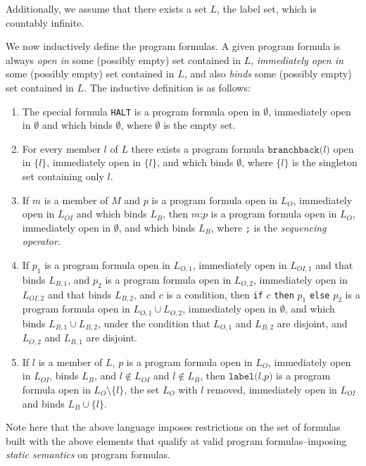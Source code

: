 \documentclass[11pt]{article}
\begin{document}
Additionally, we assume that there exists a set $L$, the label set, which is countably infinite.

We now inductively define the program formulas.  A given program formula is always \emph{open in} some (possibly empty) set contained in $L$, \emph{immediately open in} some (possibly empty) set contained in $L$, and also \emph{binds} some (possibly empty) set contained in $L$.  The inductive definition is as follows:

\begin{enumerate}
\item The special formula \texttt{HALT} is a program formula open in $\emptyset$, immediately open in $\emptyset$ and which binds $\emptyset$, where $\emptyset$ is the empty set.
\item For every member $l$ of $L$ there exists a program formula $\texttt{branchback(}l\texttt{)}$ open in $\{l\}$, immediately open in $\{l\}$, and which binds $\emptyset$, where $\{l\}$ is the singleton set containing only $l$.
\item If $m$ is a member of $M$ and $p$ is a program formula open in $L_{O}$, immediately open in $L_{OI}$ and which binds $L_{B}$, then $m\texttt{;}p$ is a program formula open in $L_{O}$, immediately open in $\emptyset$, and which binds $L_{B}$, where \texttt{;} is the \emph{sequencing operator}.
\item If $p_{1}$ is a program formula open in $L_{O,1}$, immediately open in $L_{OI,1}$ and that binds $L_{B,1}$, and $p_{2}$ is a program formula open in $L_{O,2}$, immediately open in $L_{OI,2}$ and that binds $L_{B,2}$, and $c$ is a condition, then \texttt{if} $c$ \texttt{then} $p_{1}$ \texttt{else} $p_{2}$ is a program formula open in $L_{O,1} \cup L_{O,2}$, immediately open in $\emptyset$, and which binds $L_{B,1} \cup L_{B,2}$, under the condition that $L_{O,1}$ and $L_{B,2}$ are disjoint, and $L_{O,2}$ and $L_{B,1}$ are disjoint.
\item If $l$ is a member of $L$, $p$ is a program formula open in $L_{O}$, immediately open in $L_{OI}$, binds $L_{B}$, and $l \notin L_{OI}$ and $l \notin L_{B}$, then $\texttt{label(}l\texttt{,} p\texttt{)}$ is a program formula open in $L_{O} \setminus \{l\}$, the set $L_{O}$ with $l$ removed, immediately open in $L_{OI}$ and binds $L_{B} \cup \{l\}$.
\end{enumerate}

Note here that the above language imposes restrictions on the set of formulas built with the above elements that qualify at valid program formulas--imposing \emph{static semantics} on program formulas.
\end{document}

